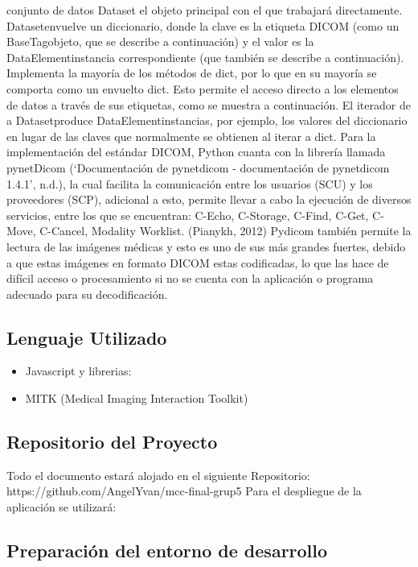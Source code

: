 \documentclass{article}
\begin{document}
conjunto de datos
Dataset el objeto principal con el que trabajará directamente. Datasetenvuelve un diccionario, donde la clave es la etiqueta DICOM (como un BaseTagobjeto, que se describe a continuación) y el valor es la DataElementinstancia correspondiente (que también se describe a continuación). Implementa la mayoría de los métodos de dict, por lo que en su mayoría se comporta como un envuelto dict. Esto permite el acceso directo a los elementos de datos a través de sus etiquetas, como se muestra a continuación.
 El iterador de a Datasetproduce DataElementinstancias, por ejemplo, los valores del diccionario en lugar de las claves que normalmente se obtienen al iterar a dict.
 Para la implementación del estándar DICOM, Python cuanta con la librería llamada pynetDicom (‘Documentación de pynetdicom - documentación de pynetdicom 1.4.1’, n.d.),
la cual facilita la comunicación entre los usuarios (SCU) y los proveedores (SCP), adicional a esto, permite llevar a cabo la ejecución de diversos servicios, entre los que se encuentran: C-Echo, C-Storage, C-Find, C-Get, C-Move, C-Cancel, Modality Worklist.
(Pianykh, 2012) Pydicom también permite la lectura de las imágenes médicas y esto es uno de sus más grandes fuertes, debido a que estas imágenes en formato DICOM estas codificadas, lo que las hace de difícil acceso o procesamiento si no se cuenta con la aplicación o programa
adecuado para su decodificación.
\subsection{Lenguaje Utilizado}
\begin{itemize}
	\item Javascript y librerias:
	\item MITK (Medical Imaging Interaction Toolkit)
	\end{itemize}
	


\subsection{Repositorio del Proyecto}

Todo el documento estará alojado en el siguiente Repositorio: https://github.com/AngelYvan/mcc-final-grup5
Para el despliegue de la aplicación se utilizará: 

\subsection{Preparación del entorno de desarrollo}
\end{document}
